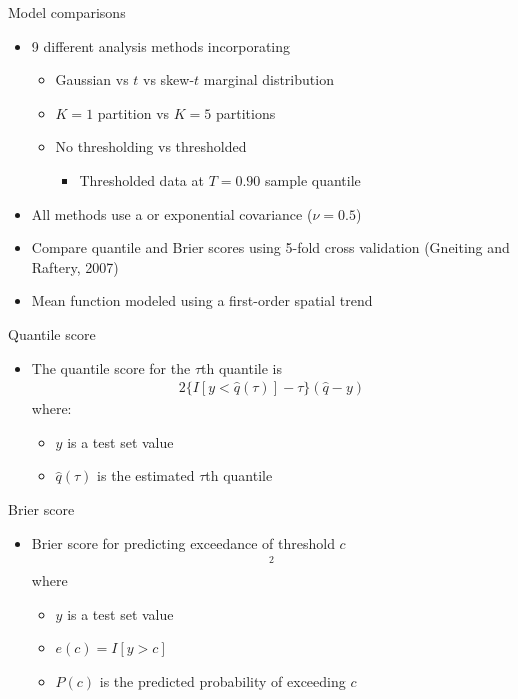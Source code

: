 \documentclass{beamer}
\begin{document}
\begin{frame}{Model comparisons}
  \begin{itemize} \setlength{\itemsep}{0.5em}
    \item 9 different analysis methods incorporating
    \begin{itemize}
      \item Gaussian vs $t$ vs skew-$t$ marginal distribution
      \item $K=1$ partition vs $K=5$ partitions
      \item No thresholding vs thresholded
      \begin{itemize}
        \item Thresholded data at $T=0.90$ sample quantile
      \end{itemize}
    \end{itemize}
    \item All methods use a \Matern or exponential covariance ($\nu = 0.5$)
    \item Compare quantile and Brier scores using 5-fold cross validation (Gneiting and Raftery, 2007)
    \item Mean function modeled using a first-order spatial trend
  \end{itemize}
\end{frame}

\begin{frame}{Quantile score}
  \begin{itemize} \setlength{\itemsep}{0.5em}
    \item The quantile score for the $\tau$th quantile is
    \begin{align*}
      2 \{ I[y < \widehat{q}(\tau)] - \tau\} (\widehat{q} - y)
    \end{align*}
    where:
    \begin{itemize}
      \item $y$ is a test set value
      \item $\widehat{q}(\tau)$ is the estimated $\tau$th quantile
    \end{itemize}
  \end{itemize}
\end{frame}

\begin{frame}{Brier score}
  \begin{itemize} \setlength{\itemsep}{0.5em}
	\item Brier score for predicting exceedance of threshold $c$
	\begin{align*}
	  [e(c) - P(c)]^2
	\end{align*}
	where 
	\begin{itemize}
		\item $y$ is a test set value
		\item $e(c) = I[y > c]$
		\item $P(c)$ is the predicted probability of exceeding $c$
	\end{itemize}
  \end{itemize}
\end{frame}
\end{document}
